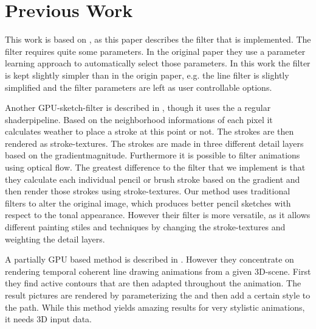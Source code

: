 \section{Previous Work}
This work is based on \cite{mainPaper}, as this paper describes the filter that
is implemented. The filter requires quite some parameters. In the original paper
they use a parameter learning approach to automatically select those parameters.
In this work the filter is kept slightly simpler than in the origin paper, e.g.
the line filter is slightly simplified and the filter parameters are left as
user controllable options. 

Another GPU-sketch-filter is described in \cite{Lu:2010:IPS}, though it uses the
a regular shaderpipeline. Based on the neighborhood informations of each pixel
it calculates weather to place a stroke at this point or not. The strokes are
then rendered as stroke-textures. The strokes are made in three different detail
layers based on the gradientmagnitude. Furthermore it is possible to filter
animations using optical flow. The greatest difference to the filter that we
implement is that they calculate each individual pencil or brush stroke based on
the gradient and then render those strokes using stroke-textures. Our method
uses traditional filters to alter the original image, which produces better
pencil sketches with respect to the tonal appearance. However their filter is
more versatile, as it allows different painting stiles and techniques by
changing the stroke-textures and weighting the detail layers.


A partially GPU based method is described in \cite{Benard:2012:ASC}. However
they concentrate on rendering temporal coherent line drawing animations from a
given 3D-scene. First they find active contours that are then adapted throughout
the animation. The result pictures are rendered by parameterizing the and then
add a certain style to the path. While this method yields amazing results for
very stylistic animations, it needs 3D input data.
